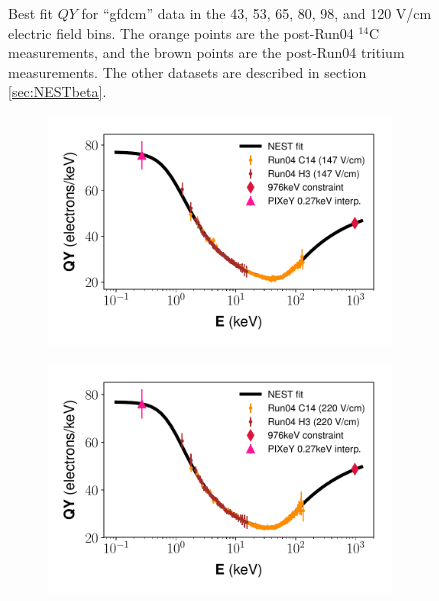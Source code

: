 \begin{figure}[h!]
\begin{subfigure}{0.5\textwidth}
  \caption{}
\end{subfigure}
\caption{Best fit $QY$ for ``gfdcm'' data in the 43, 53, 65, 80, 98, and 120 V/cm electric field bins. The orange points are the post-Run04 $^{14}$C measurements, and the brown points are the post-Run04 tritium measurements. The other datasets are described in section \ref{sec:NESTbeta}.}
\label{fig:gfdcm_prelim_QY1}
\end{figure}

\begin{figure}[h!]
\centering
\begin{subfigure}{0.5\textwidth}
  \centering
  \includegraphics[width=\textwidth]{Figures/Yields_fit_old/NEST_fit_147Vcm_old.pdf}
  \caption{}
\end{subfigure}%
\begin{subfigure}{0.5\textwidth}
  \centering
  \includegraphics[width=\textwidth]{Figures/Yields_fit_old/NEST_fit_220Vcm_old.pdf}

\end{subfigure}
\end{figure}
